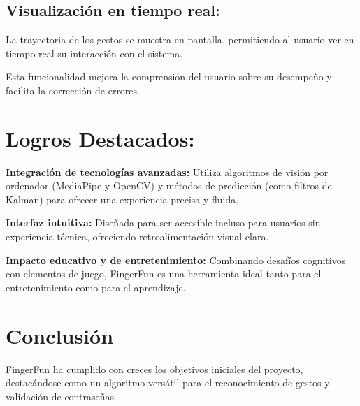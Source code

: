 \subsection{Visualización en tiempo real:}

La trayectoria de los gestos se muestra en pantalla, permitiendo al usuario ver en tiempo real su interacción con el sistema.

Esta funcionalidad mejora la comprensión del usuario sobre su desempeño y facilita la corrección de errores.

\section{Logros Destacados:}

\textbf{Integración de tecnologías avanzadas:} Utiliza algoritmos de visión por ordenador (MediaPipe y OpenCV) y métodos de predicción (como filtros de Kalman) para ofrecer una experiencia precisa y fluida.

\textbf{Interfaz intuitiva:} Diseñada para ser accesible incluso para usuarios sin experiencia técnica, ofreciendo retroalimentación visual clara.

\textbf{Impacto educativo y de entretenimiento:} Combinando desafíos cognitivos con elementos de juego, FingerFun es una herramienta ideal tanto para el entretenimiento como para el aprendizaje.

\section{Conclusión}

FingerFun ha cumplido con creces los objetivos iniciales del proyecto, destacándose como un algoritmo versátil para el reconocimiento de gestos y validación de contraseñas.
